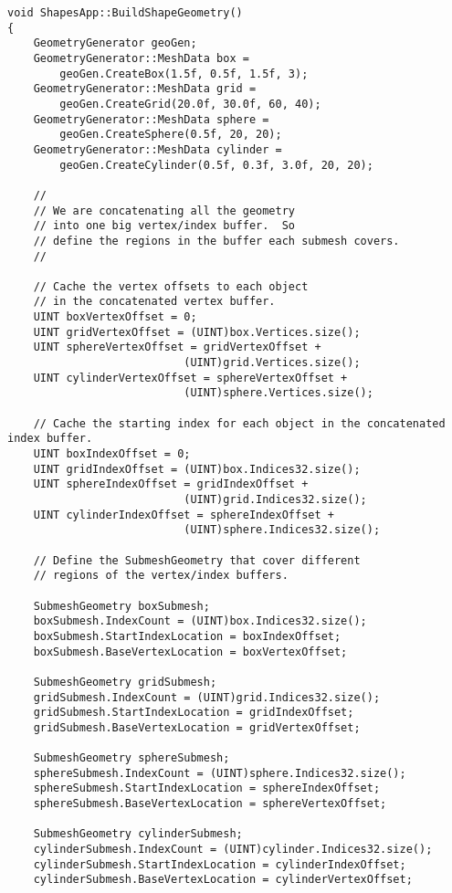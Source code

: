 \begin{lstlisting}
void ShapesApp::BuildShapeGeometry()
{
    GeometryGenerator geoGen;
    GeometryGenerator::MeshData box = 
        geoGen.CreateBox(1.5f, 0.5f, 1.5f, 3);
    GeometryGenerator::MeshData grid = 
        geoGen.CreateGrid(20.0f, 30.0f, 60, 40);
    GeometryGenerator::MeshData sphere = 
        geoGen.CreateSphere(0.5f, 20, 20);
    GeometryGenerator::MeshData cylinder = 
        geoGen.CreateCylinder(0.5f, 0.3f, 3.0f, 20, 20);

    //
    // We are concatenating all the geometry 
    // into one big vertex/index buffer.  So
    // define the regions in the buffer each submesh covers.
    //

    // Cache the vertex offsets to each object 
    // in the concatenated vertex buffer.
    UINT boxVertexOffset = 0;
    UINT gridVertexOffset = (UINT)box.Vertices.size();
    UINT sphereVertexOffset = gridVertexOffset + 
                           (UINT)grid.Vertices.size();
    UINT cylinderVertexOffset = sphereVertexOffset + 
                           (UINT)sphere.Vertices.size();

    // Cache the starting index for each object in the concatenated index buffer.
    UINT boxIndexOffset = 0;
    UINT gridIndexOffset = (UINT)box.Indices32.size();
    UINT sphereIndexOffset = gridIndexOffset + 
                           (UINT)grid.Indices32.size();
    UINT cylinderIndexOffset = sphereIndexOffset + 
                           (UINT)sphere.Indices32.size();

    // Define the SubmeshGeometry that cover different 
    // regions of the vertex/index buffers.

    SubmeshGeometry boxSubmesh;
    boxSubmesh.IndexCount = (UINT)box.Indices32.size();
    boxSubmesh.StartIndexLocation = boxIndexOffset;
    boxSubmesh.BaseVertexLocation = boxVertexOffset;

    SubmeshGeometry gridSubmesh;
    gridSubmesh.IndexCount = (UINT)grid.Indices32.size();
    gridSubmesh.StartIndexLocation = gridIndexOffset;
    gridSubmesh.BaseVertexLocation = gridVertexOffset;

    SubmeshGeometry sphereSubmesh;
    sphereSubmesh.IndexCount = (UINT)sphere.Indices32.size();
    sphereSubmesh.StartIndexLocation = sphereIndexOffset;
    sphereSubmesh.BaseVertexLocation = sphereVertexOffset;

    SubmeshGeometry cylinderSubmesh;
    cylinderSubmesh.IndexCount = (UINT)cylinder.Indices32.size();
    cylinderSubmesh.StartIndexLocation = cylinderIndexOffset;
    cylinderSubmesh.BaseVertexLocation = cylinderVertexOffset;


\end{lstlisting}
